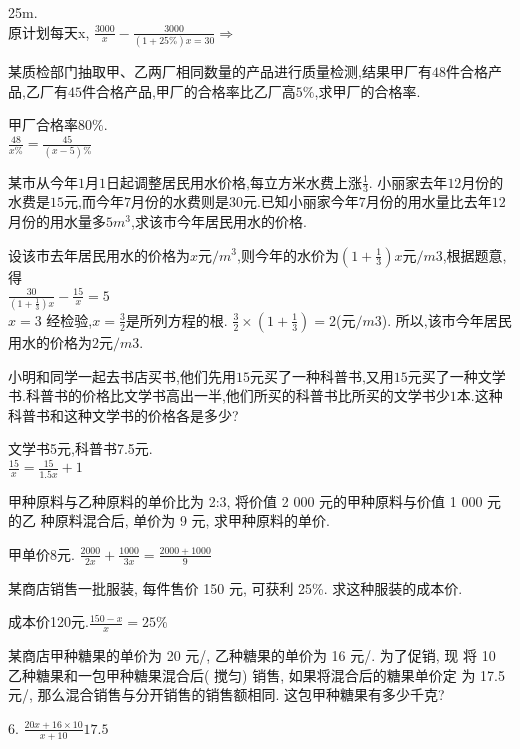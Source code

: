 \documentclass[cn,blue,12pt]{elegantbook}
\begin{document}
\begin{shiti}
\begin{solution}
        25m.\\
        原计划每天x, \(\frac{3000}{x}-\frac{3000}{(1+25\%)x=30} \Rightarrow \)
\end{solution}
\item 某质检部门抽取甲、乙两厂相同数量的产品进行质量检测,结果甲厂有\( 48 \)件合格产品,乙厂有\( 45 \)件合格产品,甲厂的合格率比乙厂高\( 5\%\),求甲厂的合格率.
\begin{solution}
        甲厂合格率80\%.\\
        \(\frac{48}{x\%}=\frac{45}{(x-5)\%}\)
\end{solution}
\item 某市从今年\( 1 \)月\( 1 \)日起调整居民用水价格,每立方米水费上涨\( \frac{1}{3}\). 小丽家去年\( 12 \)月份的水费是\( 15 \)元,而今年\( 7 \)月份的水费则是\( 30 \)元.已知小丽家今年\( 7 \)月份的用水量比去年\( 12 \)月份的用水量多\( 5 m^3 \),求该市今年居民用水的价格.
\begin{solution}
        设该市去年居民用水的价格为\( x \)元\(/m^3\),则今年的水价为\((1 + \frac{1}{3}) x\)元\(/m3\),根据题意,得\\
        \(\frac{30}{(1+\frac{1}{3})x}-\frac{15}{x}=5\)\\
\(x = 3\)
经检验,\( x = \frac{3}{2}\)是所列方程的根.
\(\frac{3}{2} \times  (1 + \frac{1}{3}) \)\( = 2\)(元\(/m3\)).
所以,该市今年居民用水的价格为\( 2 \)元\(/m3.\)
\end{solution}
\item 小明和同学一起去书店买书,他们先用\( 15 \)元买了一种科普书,又用\( 15 \)元买了一种文学书.科普书的价格比文学书高出一半,他们所买的科普书比所买的文学书少\( 1 \)本.这种科普书和这种文学书的价格各是多少?
\begin{solution}
        文学书5元,科普书7.5元.\\
        \(\frac{15}{x}=\frac{15}{1.5x}+1\)
\end{solution}
\item 甲种原料与乙种原料的单价比为 2:3, 将价值 2 000 元的甲种原料与价值 1 000 元的乙 种原料混合后, 单价为 9 元, 求甲种原料的单价.
\begin{solution}
        甲单价8元. \(\frac{2000}{2x}+\frac{1000}{3x}=\frac{2000+1000}{9}\)
\end{solution}
\item 某商店销售一批服装, 每件售价 150 元, 可获利 25\%. 求这种服装的成本价.
\begin{solution}
        成本价120元.\(\frac{150-x}{x}=25\%\)
\end{solution}
\item 某商店甲种糖果的单价为 20 元/\kilogram, 乙种糖果的单价为 16 元/\kilogram. 为了促销, 现 将 10 \kilogram 乙种糖果和一包甲种糖果混合后( 搅匀) 销售, 如果将混合后的糖果单价定 为 17.5 元/\kilogram, 那么混合销售与分开销售的销售额相同. 这包甲种糖果有多少千克?
\begin{solution}
        6\kilogram. \(\frac{20x+16\times 10}{x+10}17.5\)
\end{solution}
\end{shiti}
\end{document}

